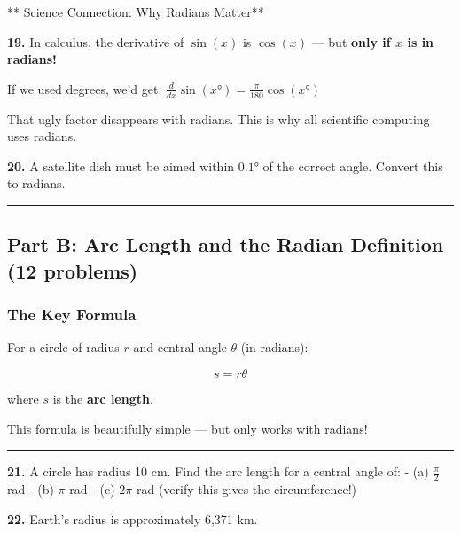 \documentclass[
  11pt,
]{article}
\begin{document}
** Science Connection: Why Radians Matter**

\textbf{19.} In calculus, the derivative of \(\sin(x)\) is \(\cos(x)\)
--- but \textbf{only if \(x\) is in radians!}

If we used degrees, we'd get:
\(\frac{d}{dx}\sin(x°) = \frac{\pi}{180}\cos(x°)\)

That ugly factor disappears with radians. This is why all scientific
computing uses radians.

\textbf{20.} A satellite dish must be aimed within \(0.1°\) of the
correct angle. Convert this to radians.

\begin{center}\rule{0.5\linewidth}{0.5pt}\end{center}

\hypertarget{part-b-arc-length-and-the-radian-definition-12-problems}{%
\subsection{Part B: Arc Length and the Radian Definition (12
problems)}\label{part-b-arc-length-and-the-radian-definition-12-problems}}

\hypertarget{the-key-formula}{%
\subsubsection{The Key Formula}\label{the-key-formula}}

For a circle of radius \(r\) and central angle \(\theta\) (in radians):

\[\boxed{s = r\theta}\]

where \(s\) is the \textbf{arc length}.

This formula is beautifully simple --- but only works with radians!

\begin{center}\rule{0.5\linewidth}{0.5pt}\end{center}

\textbf{21.} A circle has radius 10 cm. Find the arc length for a
central angle of: - (a) \(\frac{\pi}{2}\) rad - (b) \(\pi\) rad - (c)
\(2\pi\) rad (verify this gives the circumference!)

\textbf{22.} Earth's radius is approximately 6,371 km.
\end{document}
